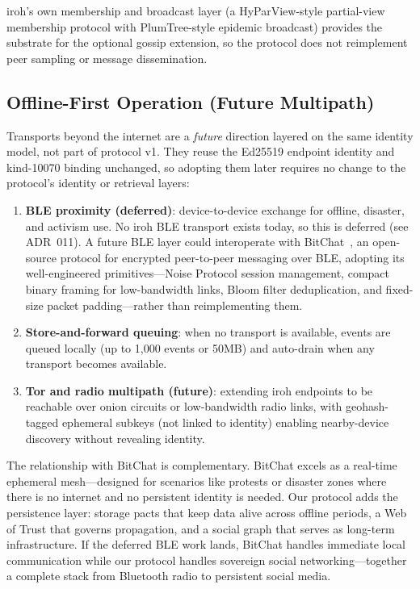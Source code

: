 \documentclass[11pt,a4paper]{article}
\begin{document}
iroh's own membership and broadcast layer (a HyParView-style partial-view membership protocol with PlumTree-style epidemic broadcast) provides the substrate for the optional gossip extension, so the protocol does not reimplement peer sampling or message dissemination.

\subsection{Offline-First Operation (Future Multipath)}

Transports beyond the internet are a \emph{future} direction layered on the same identity model, not part of protocol v1. They reuse the Ed25519 endpoint identity and kind-10070 binding unchanged, so adopting them later requires no change to the protocol's identity or retrieval layers:

\begin{enumerate}
  \item \textbf{BLE proximity (deferred)}: device-to-device exchange for offline, disaster, and activism use. No iroh BLE transport exists today, so this is deferred (see ADR~011). A future BLE layer could interoperate with BitChat~\cite{bitchat}, an open-source protocol for encrypted peer-to-peer messaging over BLE, adopting its well-engineered primitives---Noise Protocol session management, compact binary framing for low-bandwidth links, Bloom filter deduplication, and fixed-size packet padding---rather than reimplementing them.
  \item \textbf{Store-and-forward queuing}: when no transport is available, events are queued locally (up to 1,000 events or 50MB) and auto-drain when any transport becomes available.
  \item \textbf{Tor and radio multipath (future)}: extending iroh endpoints to be reachable over onion circuits or low-bandwidth radio links, with geohash-tagged ephemeral subkeys (not linked to identity) enabling nearby-device discovery without revealing identity.
\end{enumerate}

The relationship with BitChat is complementary. BitChat excels as a real-time ephemeral mesh---designed for scenarios like protests or disaster zones where there is no internet and no persistent identity is needed. Our protocol adds the persistence layer: storage pacts that keep data alive across offline periods, a Web of Trust that governs propagation, and a social graph that serves as long-term infrastructure. If the deferred BLE work lands, BitChat handles immediate local communication while our protocol handles sovereign social networking---together a complete stack from Bluetooth radio to persistent social media.
\end{document}
